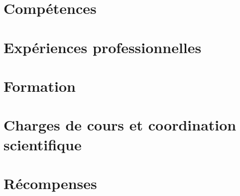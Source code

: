 \documentclass{prometheus_cv}
\begin{document}
\thispagestyle{empty}				%
\pagestyle{fancy}			 		%

\vspace*{-1cm}
\centering 


\vspace*{0.4cm}
\section{Compétences}


\vspace*{0.4cm}
\section{Expériences professionnelles}


\vspace*{0.4cm}
\section{Formation}


\section{Charges de cours et coordination scientifique}


\section{Récompenses}


\printbibliography[title={Publications}, keyword={publications}]
\printbibliography[title={Communications}, keyword={communications}]

%

%
\end{document}
